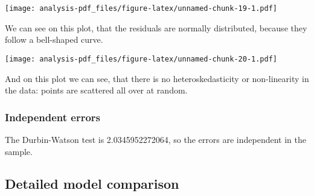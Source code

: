 \documentclass[
]{article}
\begin{document}
\texttt{[image: analysis-pdf\_files/figure-latex/unnamed-chunk-19-1.pdf]}

We can see on this plot, that the residuals are normally distributed,
because they follow a bell-shaped curve.

\texttt{[image: analysis-pdf\_files/figure-latex/unnamed-chunk-20-1.pdf]}

And on this plot we can see, that there is no heteroskedasticity or
non-linearity in the data: points are scattered all over at random.

\hypertarget{independent-errors}{%
\subsubsection{Independent errors}\label{independent-errors}}

The Durbin-Watson test is 2.0345952272064, so the errors are independent
in the sample.

\hypertarget{detailed-model-comparison}{%
\subsection{Detailed model comparison}\label{detailed-model-comparison}}
\end{document}
